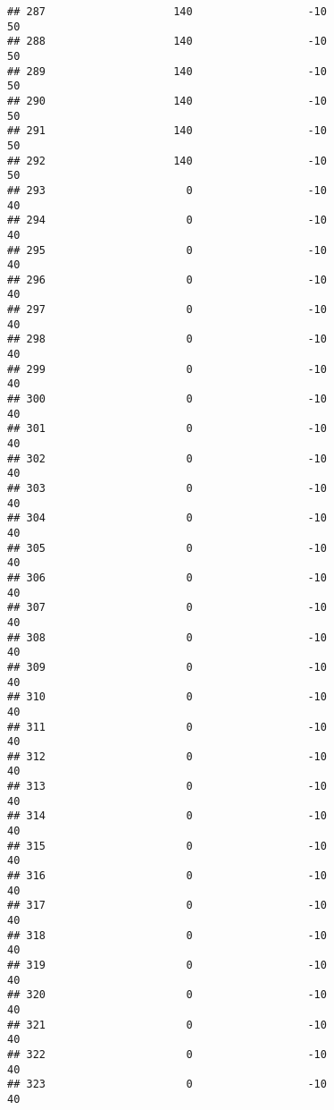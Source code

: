 \documentclass[]{article}
\begin{document}
\begin{verbatim}
## 287                    140                  -10                   50
## 288                    140                  -10                   50
## 289                    140                  -10                   50
## 290                    140                  -10                   50
## 291                    140                  -10                   50
## 292                    140                  -10                   50
## 293                      0                  -10                   40
## 294                      0                  -10                   40
## 295                      0                  -10                   40
## 296                      0                  -10                   40
## 297                      0                  -10                   40
## 298                      0                  -10                   40
## 299                      0                  -10                   40
## 300                      0                  -10                   40
## 301                      0                  -10                   40
## 302                      0                  -10                   40
## 303                      0                  -10                   40
## 304                      0                  -10                   40
## 305                      0                  -10                   40
## 306                      0                  -10                   40
## 307                      0                  -10                   40
## 308                      0                  -10                   40
## 309                      0                  -10                   40
## 310                      0                  -10                   40
## 311                      0                  -10                   40
## 312                      0                  -10                   40
## 313                      0                  -10                   40
## 314                      0                  -10                   40
## 315                      0                  -10                   40
## 316                      0                  -10                   40
## 317                      0                  -10                   40
## 318                      0                  -10                   40
## 319                      0                  -10                   40
## 320                      0                  -10                   40
## 321                      0                  -10                   40
## 322                      0                  -10                   40
## 323                      0                  -10                   40

\end{verbatim}
\end{document}
